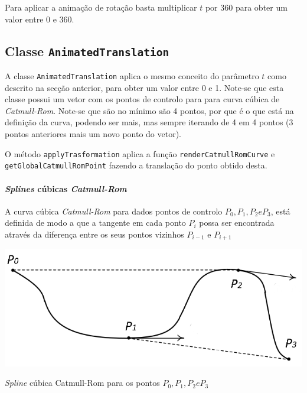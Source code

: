Para aplicar a animação de rotação basta multiplicar $t$ por 360 para obter um
valor entre 0 e 360.


\subsection{Classe \texttt{AnimatedTranslation}}

A classe \texttt{AnimatedTranslation} aplica o mesmo conceito do parâmetro
$t$ como descrito na secção anterior, para obter um valor entre 0 e 1. Note-se
que esta classe possui um vetor com os pontos de controlo para para curva cúbica
de \emph{Catmull-Rom}. Note-se que são no mínimo são 4 pontos, por que é o que
está na definição da curva, podendo ser mais, mas sempre iterando de 4 em
4 pontos (3 pontos anteriores mais um novo ponto do vetor).

O método \texttt{applyTrasformation} aplica a função
\texttt{renderCatmullRomCurve} e \texttt{getGlobalCatmullRomPoint} fazendo
a translação do ponto obtido desta.   

\paragraph{\emph{Splines} cúbicas \emph{Catmull-Rom}}

A curva cúbica \emph{Catmull-Rom} para dados pontos de controlo $P_{0}, P_{1},
P_{2} e P_{3}$, está definida de modo a que a tangente em cada ponto $P_{i}$
possa ser encontrada através da diferença entre os seus pontos vizinhos
$P_{i-1}$ e $P_{i+1}$

\begin{center}
 	
 	\includegraphics[scale=0.5,keepaspectratio]{resources/catmullDeriv.png}
 	\captionsetup{type=figure, width=0.8\linewidth}
	\caption{\emph{Spline} cúbica Catmull-Rom para os pontos $P_{0}, P_{1}, P_{2} e P_{3}$}
\label{fig:ssec1:diagram:plane:to:sphere} 
\end{center}

